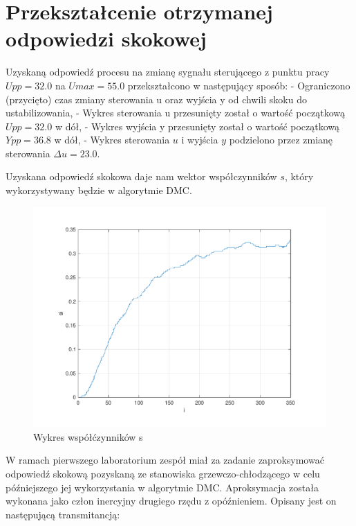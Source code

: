 \section{Przekształcenie otrzymanej odpowiedzi skokowej}

Uzyskaną odpowiedź procesu na zmianę sygnału sterującego z punktu pracy $Upp=\num{32.0}$ na $Umax=\num{55.0}$ przekształcono w następujący sposób:\newline
\indent - Ograniczono (przycięto) czas zmiany sterowania u oraz wyjścia y od chwili skoku do ustabilizowania,\newline
\indent - Wykres sterowania u przesunięty został o wartość początkową $Upp=\num{32.0}$ w dół,\newline
\indent - Wykres wyjścia y przesunięty został o wartość początkową $Ypp=\num{36.8}$ w dół,\newline
\indent - Wykres sterowania $u$ i wyjścia $y$ podzielono przez zmianę sterowania $\Delta u=\num{23.0}$.

Uzyskana odpowiedź skokowa daje nam wektor współczynników $s$,
który wykorzystywany będzie w algorytmie DMC.

\begin{figure}[H]
    \centering
    \includegraphics[scale=0.75]{../lab/zad_3/zad3s.pdf}
    \caption{Wykres współćzynników s}
\end{figure}

W ramach pierwszego laboratorium zespół miał za zadanie 
zaproksymować odpowiedź skokową pozyskaną ze stanowiska grzewczo-chłodzącego w celu 
późniejszego jej wykorzystania w algorytmie DMC. 
Aproksymacja została wykonana jako człon inercyjny drugiego rzędu z opóźnieniem. 
Opisany jest on następującą transmitancją: 

